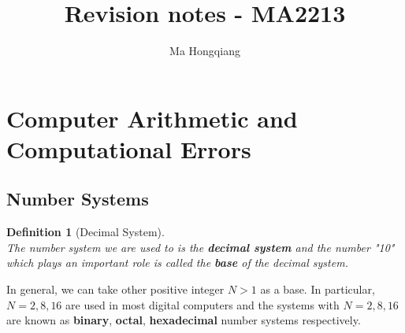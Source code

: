 \documentclass[12pt]{article}
\newtheorem{definition}{Definition}[section]
\theoremstyle{definition}
\begin{document}
\title{Revision notes - MA2213}
\author{Ma Hongqiang}
\maketitle
\tableofcontents

\clearpage
\section{Computer Arithmetic and Computational Errors}
\subsection{Number Systems}
\begin{definition}[Decimal System]
\hfill\\\normalfont The number system we are used to is the \textbf{decimal system} and the number "10" which plays an important role is called the \textbf{base} of the decimal system.
\end{definition}
In general, we can take other positive integer $N>1$ as a base. In particular, $N = 2, 8, 16$ are used in most digital computers and the systems with $N = 2,8,16$ are known as \textbf{binary}, \textbf{octal}, \textbf{hexadecimal} number systems respectively.\\
\end{document}

